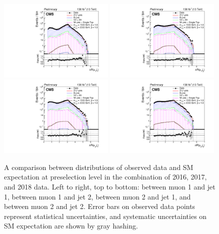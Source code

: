 \begin{figure}[H]
       \centering
       {\includegraphics[width=0.49\textwidth]{Images/Analysis/Results_combined_Unblinded/Plots/Preselection/BasicLQ_uujj_DR_muon1jet1_standard.pdf}}
       {\includegraphics[width=0.49\textwidth]{Images/Analysis/Results_combined_Unblinded/Plots/Preselection/BasicLQ_uujj_DR_muon1jet2_standard.pdf}}
       {\includegraphics[width=0.49\textwidth]{Images/Analysis/Results_combined_Unblinded/Plots/Preselection/BasicLQ_uujj_DR_muon2jet1_standard.pdf}}
       {\includegraphics[width=0.49\textwidth]{Images/Analysis/Results_combined_Unblinded/Plots/Preselection/BasicLQ_uujj_DR_muon2jet2_standard.pdf}}
       \caption{A comparison between distributions of observed data and SM expectation at preselection level in the combination of 2016, 2017, and 2018 data. Left to right, top to bottom: \DR between muon 1 and jet 1, \DR between muon 1 and jet 2, \DR between muon 2 and jet 1, and \DR between muon 2 and jet 2. Error bars on observed data points represent statistical uncertainties, and systematic uncertainties on SM expectation are shown by gray hashing.}
       \label{fig:preseldrCombined}
\end{figure}

